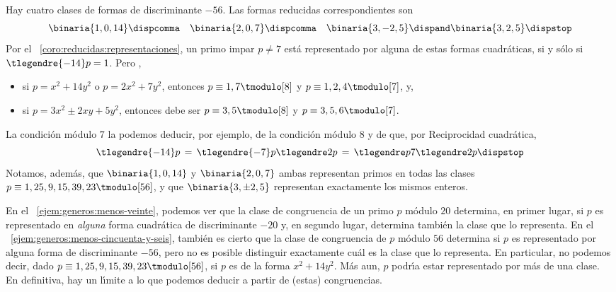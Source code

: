 \begin{ejemGeneros}\label{ejem:generos:menos-cincuenta-y-seis}
	Hay cuatro clases de formas de discriminante $-56$. Las formas
	reducidas correspondientes son
	\begin{displaymath}
		\binaria{1,0,14} \dispcomma\quad
		\binaria{2,0,7} \dispcomma\quad
		\binaria{3,-2,5} \dispand
		\binaria{3,2,5}
		\dispstop
	\end{displaymath}
	Por el \coroname~\ref{coro:reducidas:representaciones},
	un primo impar $p\neq 7$ est\'a representado por alguna de estas
	formas cuadr\'aticas, si y s\'olo si $\tlegendre{-14} p=1$. Pero
	\quedacomoejercicio,
	\begin{itemize}
		\item si $p=x^2+14y^2$ o $p=2x^2+7y^2$, entonces
			$p\equiv 1,7\tmodulo[8]$ y
			$p\equiv 1,2,4\tmodulo[7]$, y,
		\item si $p=3x^2\pm 2xy+5y^2$, entonces debe ser
			$p\equiv 3,5\tmodulo[8]$ y
			$p\equiv 3,5,6\tmodulo[7]$.
	\end{itemize}
	La condici\'on m\'odulo $7$ la podemos deducir, por ejemplo, de la
	condici\'on m\'odulo $8$ y de que, por Reciprocidad cuadr\'atica,
	\begin{displaymath}
		\tlegendre{-14} p\,=\,\tlegendre{-7} p\tlegendre 2 p\,=\,
			\tlegendre p 7\tlegendre 2 p
		\dispstop
	\end{displaymath}
	Notamos, adem\'as, que $\binaria{1,0,14}$ y $\binaria{2,0,7}$ ambas
	representan primos en todas las clases
	$p\equiv 1,25,9,15,39,23\tmodulo[56]$,
	y que $\binaria{3,\pm 2,5}$ representan exactamente los mismos
	enteros.
\end{ejemGeneros}

\begin{obsGeneros}\label{obs:generos:ejemplos}
	En el \ejemname~\ref{ejem:generos:menos-veinte},
	podemos ver que la clase de congruencia de un primo $p$ m\'odulo $20$
	determina, en primer lugar, si $p$ es representado en \emph{alguna}
	forma cuadr\'atica de discriminante $-20$ y, en segundo lugar,
	determina tambi\'en la clase que lo representa.
	En el \ejemname~\ref{ejem:generos:menos-cincuenta-y-seis}, tambi\'en
	es cierto que la clase de congruencia de $p$ m\'odulo $56$
	determina si $p$ es representado por alguna forma de discriminante
	$-56$, pero no es posible distinguir exactamente cu\'al es la clase
	que lo representa. En particular, no podemos decir, dado
	$p\equiv 1,25,9,15,39,23\tmodulo[56]$, si $p$ es de la forma
	$x^2+14y^2$. M\'as aun, $p$ podr\'{\i}a estar %
	representado por m\'as de una clase.
	En definitiva, hay un l\'{\i}mite a lo que podemos deducir a partir
	de (estas) congruencias.
\end{obsGeneros}

